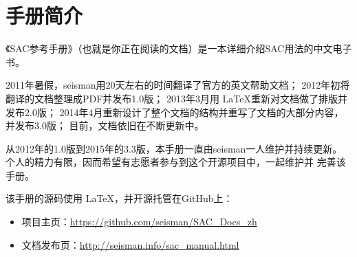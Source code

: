 \section{手册简介}
《SAC参考手册》（也就是你正在阅读的文档）是一本详细介绍SAC用法的中文电子书。

2011年暑假，seisman用20天左右的时间翻译了官方的英文帮助文档；
2012年初将翻译的文档整理成PDF并发布1.0版；
2013年3月用 \LaTeX 重新对文档做了排版并发布2.0版；
2014年4月重新设计了整个文档的结构并重写了文档的大部分内容，并发布3.0版；
目前，文档依旧在不断更新中。

从2012年的1.0版到2015年的3.3版，本手册一直由seisman一人维护并持续更新。
个人的精力有限，因而希望有志愿者参与到这个开源项目中，一起维护并
完善该手册。

该手册的源码使用 \LaTeX ，并开源托管在GitHub上：
\begin{itemize}
\item 项目主页：\url{https://github.com/seisman/SAC_Docs_zh}
\item 文档发布页：\url{http://seisman.info/sac_manual.html}
\end{itemize}
